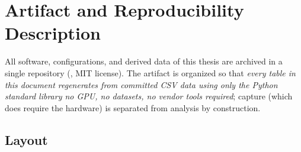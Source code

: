 \chapter{Artifact and Reproducibility Description}
\label{app:artifacts}

All software, configurations, and derived data of this thesis are archived
in a single repository (, MIT
license). The artifact is organized so that \emph{every table in this
document regenerates from committed CSV data using only the Python standard
library no GPU, no datasets, no vendor tools required}; capture (which
does require the hardware) is separated from analysis by construction.

\section{Layout}

